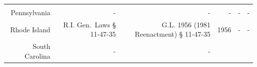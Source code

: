 \documentclass[]{article}
\begin{document}
\begin{longtable}[c]{@{}rrrrrr@{}}
\begin{minipage}[t]{0.10\columnwidth}
\strut\end{minipage}\tabularnewline
\begin{minipage}[t]{0.10\columnwidth}\raggedleft\strut
Pennsylvania
\strut\end{minipage} &
\begin{minipage}[t]{0.21\columnwidth}\raggedleft\strut
-
\strut\end{minipage} &
\begin{minipage}[t]{0.22\columnwidth}\raggedleft\strut
-
\strut\end{minipage} &
\begin{minipage}[t]{0.10\columnwidth}\raggedleft\strut
-
\strut\end{minipage} &
\begin{minipage}[t]{0.10\columnwidth}\raggedleft\strut
-
\strut\end{minipage} &
\begin{minipage}[t]{0.10\columnwidth}\raggedleft\strut
-
\strut\end{minipage}\tabularnewline
\begin{minipage}[t]{0.10\columnwidth}\raggedleft\strut
Rhode Island
\strut\end{minipage} &
\begin{minipage}[t]{0.21\columnwidth}\raggedleft\strut
R.I. Gen.~Laws § 11-47-35
\strut\end{minipage} &
\begin{minipage}[t]{0.22\columnwidth}\raggedleft\strut
G.L. 1956 (1981 Reenactment) § 11-47-35
\strut\end{minipage} &
\begin{minipage}[t]{0.10\columnwidth}\raggedleft\strut
1956
\strut\end{minipage} &
\begin{minipage}[t]{0.10\columnwidth}\raggedleft\strut
-
\strut\end{minipage} &
\begin{minipage}[t]{0.10\columnwidth}\raggedleft\strut
-
\strut\end{minipage}\tabularnewline
\begin{minipage}[t]{0.10\columnwidth}\raggedleft\strut
South Carolina
\strut\end{minipage} &
\begin{minipage}[t]{0.21\columnwidth}\raggedleft\strut
-
\strut\end{minipage} &
\begin{minipage}[t]{0.22\columnwidth}\raggedleft\strut
-
\strut\end{minipage} &

\end{longtable}
\end{document}
